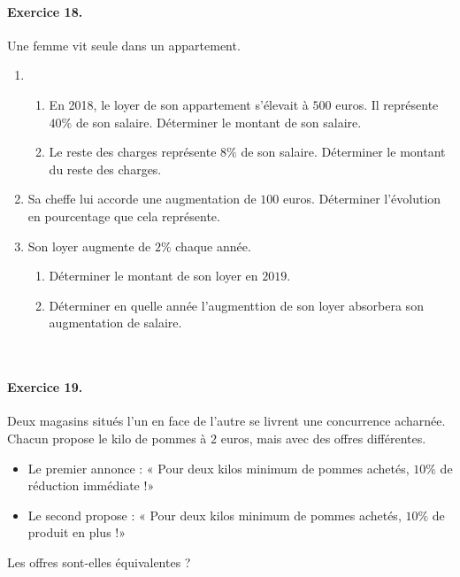\documentclass[11pt]{article}
\begin{document}
\paragraph{Exercice 18.} Une femme vit seule dans un appartement.
\begin{enumerate}
  \item \begin{enumerate}
      \item En 2018, le loyer de son appartement s'élevait à $500$ euros. Il
        représente $40\%$ de son salaire. Déterminer le montant de son salaire.
      \item Le reste des charges représente $8\%$ de son salaire. Déterminer le
        montant du reste des charges.
    \end{enumerate}
  \item Sa cheffe lui accorde une augmentation de $100$ euros. Déterminer
    l'évolution en pourcentage que cela représente.
  \item Son loyer augmente de $2\%$ chaque année.
    \begin{enumerate}
      \item Déterminer le montant de son loyer en $2019$.
      \item Déterminer en quelle année l'augmenttion de son loyer absorbera son
        augmentation de salaire.
    \end{enumerate}
\end{enumerate}
~\\[-12mm]
\paragraph{Exercice 19.} Deux magasins situés l'un en face de l'autre se
livrent une concurrence acharnée. Chacun propose le kilo de pommes à $2$ euros,
mais avec des offres différentes.
\begin{itemize}
  \item Le premier annonce : « Pour deux kilos minimum de pommes achetés, $10\%$
    de réduction immédiate !»
  \item Le second propose : « Pour deux kilos minimum de pommes achetés, $10\%$
    de produit en plus !»
\end{itemize}
Les offres sont-elles équivalentes ?
\end{document}
